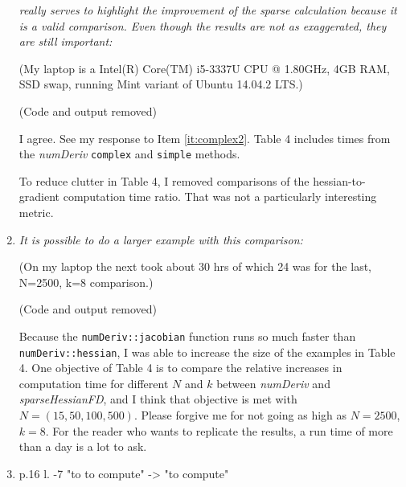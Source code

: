 \documentclass{article}
\newcommand{\pkg}[1]{\emph{#1}}
\newcommand{\code}[1]{\texttt{#1}}
\newcommand{\func}[1]{\code{#1}}
\newcommand{\method}[1]{\func{#1}}
\newenvironment{revQuote}{\itshape}{\vspace{\baselineskip}}
\newenvironment{response}{\normalfont}{\vspace{\baselineskip}}
\begin{document}
\begin{enumerate}[align=left]
\begin{revQuote}
really serves to highlight the improvement of the sparse calculation because
it is a valid comparison. Even though the results are not as exaggerated,
they are still important:

(My laptop is a  Intel(R) Core(TM) i5-3337U CPU @ 1.80GHz,  4GB RAM, SSD
swap, running Mint variant of Ubuntu 14.04.2 LTS.)

(Code and output removed)
  \end{revQuote}
  
  \begin{response}
    I agree.  See my response to Item \ref{it:complex2}.  Table 4
    includes times from the \pkg{numDeriv}
    \method{complex} and \method{simple} methods.

    To reduce clutter in Table 4, I removed comparisons of the
    hessian-to-gradient computation time ratio.  That was not a
    particularly interesting metric.
    
  \end{response}

\item\begin{revQuote}
It is possible to do a larger example with this comparison:

(On my laptop the next took about 30 hrs of which 24 was for the last,
N=2500, k=8 comparison.)

(Code and output removed)

  \end{revQuote}
  
  \begin{response}
Because the \func{numDeriv::jacobian} function runs so much faster
than  \func{numDeriv::hessian}, I was able to increase the size of the
examples in Table 4. One objective of Table 4 is to compare the relative
increases in computation time for different $N$ and $k$ between
\pkg{numDeriv} and \pkg{sparseHessianFD}, and I think that objective
is met with $N=(15, 50, 100, 500)$.  Please forgive me for not going as high as
$N=2500$, $k=8$. For the reader who wants to
replicate the results, a run time of more than a day is a lot to ask.
  \end{response}

\item\begin{revQuote}

 p.16  l. -7 "to to compute" -> "to compute"


  \end{revQuote}
  

\end{enumerate}
\end{document}

